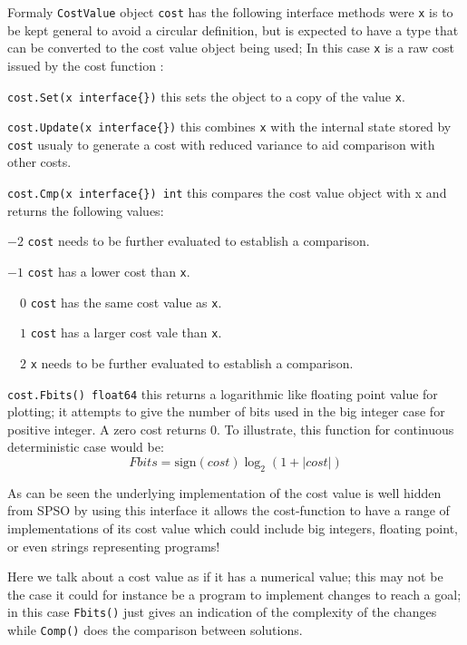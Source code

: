 \documentclass[a4paper,oneside,english]{book}
\numberwithin{equation}{section}
\numberwithin{figure}{section}
\begin{document}
Formaly \texttt{CostValue} object \texttt{cost} has the following interface methods were \texttt{x} is to be kept general to avoid a circular definition, but is expected to  have a type that can be converted to the cost value object being used; In this case \texttt{x} is a raw cost issued by the cost function  :
\begin{list}{}
	\item \texttt{cost.Set(x interface\{\})} this sets the object to a copy of the value \texttt{x}. 
	\item \texttt{cost.Update(x interface\{\})} this combines \texttt{x} with the internal state stored by \texttt{cost} usualy to generate a cost with reduced variance to aid comparison with other costs.
	\item \texttt{cost.Cmp(x interface\{\}) int} this compares the cost value object with x and returns the following values:
		\begin{list}{}
		\item $-2$ \texttt{cost} needs to be further evaluated to establish a comparison.
		\item $-1$ \texttt{cost} has a lower cost than \texttt{x}.
		\item $\quad 0$ \texttt{cost} has the same cost value as \texttt{x}.
		\item $\quad 1$ \texttt{cost} has a larger cost vale than \texttt{x}.
		\item $\quad 2$ \texttt{x} needs to be further evaluated to establish a comparison.
		\end{list}
	
	\item \texttt{cost.Fbits() float64} this returns a logarithmic like floating point value for plotting; it attempts to give the number of bits  used in the big integer case for positive integer. A zero cost returns $0$. To illustrate, this function for continuous deterministic  case  would be:
	\[ Fbits=\mathrm{sign}(cost)\log_2(1+|cost|)   \]

\end{list}
As can be seen the underlying implementation of the cost value is well hidden from SPSO by using this interface it allows the cost-function to have a range of implementations  of its cost value which could include big integers, floating point, or even strings representing programs! 

Here we talk about a cost value as if it has a numerical value; this may not be  the case it could for instance be a program to implement changes to reach a goal; in this case  \texttt{Fbits()} just gives an indication of the complexity of the changes while \texttt{Comp()} does the comparison between solutions. 
\end{document}
